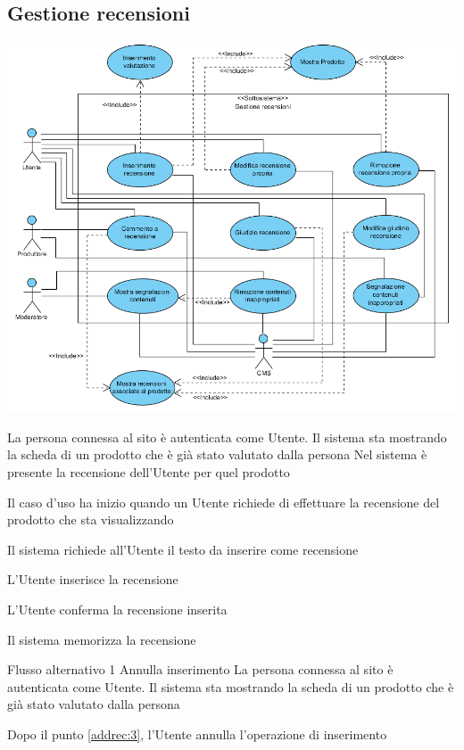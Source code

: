 \subsection{Gestione recensioni}
\begin{center}
   \includegraphics[width=\textwidth]{assets/visualParadigm/cu/GestioneRecensioni}
\end{center}
{}
{La persona connessa al sito è autenticata come Utente. Il sistema sta mostrando la scheda di un prodotto che è già stato valutato dalla persona}
{Nel sistema è presente la recensione dell'Utente per quel prodotto}
{\begin{enumCU}
	\item Il caso d'uso ha inizio quando un Utente richiede di effettuare la recensione del prodotto che sta visualizzando
	\item Il sistema richiede all'Utente il testo da inserire come recensione
	\item L'Utente inserisce la recensione\label{addrec:3}
	\item L'Utente conferma la recensione inserita
	\item Il sistema memorizza la recensione
\end{enumCU}}
%
{Flusso alternativo 1}%
{Annulla inserimento}%
{La persona connessa al sito è autenticata come Utente. Il sistema sta mostrando la scheda di un prodotto che è già stato valutato dalla persona}%
{\postNulle}%
{\begin{enumCU}
		\item Dopo il punto \ref{addrec:3}, l'Utente annulla l'operazione di inserimento
	\end{enumCU}}%

